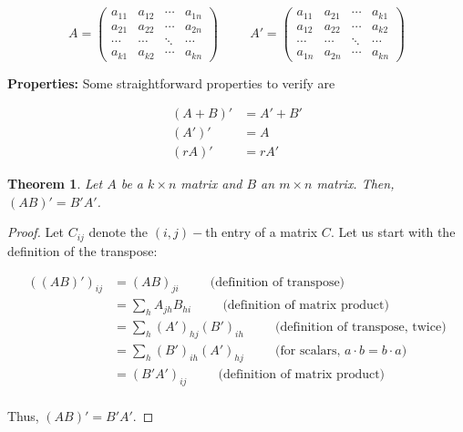 \documentclass[a4paper,11pt]{article}
\theoremstyle{definition}
\theoremstyle{plain}
\newtheorem{theorem}{Theorem}
\begin{document}
\[
A = \begin{pmatrix} a_{11} & a_{12} & \cdots & a_{1n} \\ a_{21} & a_{22} & \cdots & a_{2n} \\ \cdots & \cdots & \ddots & \cdots \\ a_{k1} & a_{k2} & \cdots & a_{kn} \end{pmatrix} \: \qquad \: A' = \begin{pmatrix} a_{11} & a_{21} & \cdots & a_{k1} \\ a_{12} & a_{22} & \cdots & a_{k2} \\ \cdots & \cdots & \ddots & \cdots \\ a_{1n} & a_{2n} & \cdots & a_{kn} \end{pmatrix}
\]

\textbf{Properties:} Some straightforward properties to verify are

\begin{align*}
(A + B)' &= A' + B' \\
\left(A'\right)' &= A \\
\left(r A\right)' &= r A'
\end{align*}

\begin{theorem}
Let \(A\) be a \(k\times n\) matrix and \(B\) an
\(m\times n\) matrix. Then, \((AB)' = B'A'\).
\end{theorem}

\begin{proof}
Let \(C_{ij}\) denote the \((i,j)-\)th entry of a matrix \(C\). Let us
start with the definition of the transpose:

\begin{align*}
\left((AB)'\right)_{ij} &= (AB)_{ji} \: \qquad \: \text{(definition of transpose)}\\
&= \sum_h A_{jh} B_{hi}  \: \qquad \: \text{(definition of matrix product)}\\ 
&= \sum_h \left(A'\right)_{hj} \left(B' \right)_{ih}  \: \qquad \: \text{(definition of transpose, twice)} \\
&= \sum_h \left(B' \right)_{ih}\left(A'\right)_{hj}  \: \qquad \: \text{(for scalars, $a \cdot b = b\cdot a$)} \\
&= \left(B'A'\right)_{ij} \: \qquad \: \text{(definition of matrix product)} \\
\end{align*}

Thus, \((AB)' = B'A'\).
\end{proof}
\end{document}
